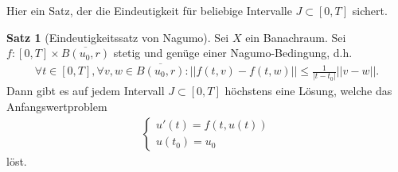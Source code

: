 \documentclass[a4paper]{article}
\theoremstyle{definition}
\newtheorem{theorem}{Satz}
\begin{document}
Hier ein Satz, der die Eindeutigkeit für beliebige Intervalle $J \subset [0,T]$ sichert. 

\begin{theorem}[Eindeutigkeitssatz von Nagumo]
    Sei $X$ ein Banachraum. Sei $f: [0,T] \times \overline{B(u_0,r)}$ stetig und genüge einer Nagumo-Bedingung, d.h. 
    \begin{align*}
        \forall t \in [0,T], \forall v,w \in \overline{B(u_0,r)}: ||f(t,v) - f(t,w)|| \leq \frac{1}{|t-t_0|} ||v-w||.
    \end{align*}
    Dann gibt es auf jedem Intervall $J \subset [0,T]$ höchstens eine Lösung, welche das Anfangswertproblem
    \begin{align*}
        \begin{cases}
            u'(t) = f(t,u(t)) \\
            u(t_0) = u_0
        \end{cases}
    \end{align*}
    löst. 
\end{theorem}
\end{document}
